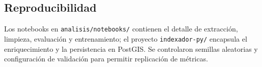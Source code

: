 \subsection*{Reproducibilidad}
Los notebooks en \texttt{analisis/notebooks/} contienen el detalle de extracción, limpieza, evaluación y entrenamiento; el proyecto \texttt{indexador-py/} encapsula el enriquecimiento y la persistencia en PostGIS. Se controlaron semillas aleatorias y configuración de validación para permitir replicación de métricas.

